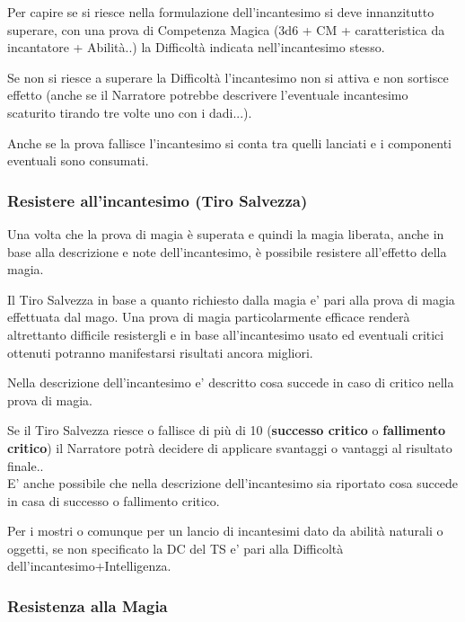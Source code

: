 \begin{multicols}{2}
Per capire se si riesce nella formulazione dell'incantesimo si deve innanzitutto superare, con una prova di Competenza Magica (3d6 + CM + caratteristica da incantatore + Abilità..) la Difficoltà indicata nell'incantesimo stesso.

Se non si riesce a superare la Difficoltà l'incantesimo non si attiva e non sortisce effetto (anche se il Narratore potrebbe descrivere l'eventuale incantesimo scaturito tirando tre volte uno con i dadi...).

Anche se la prova fallisce l'incantesimo si conta tra quelli lanciati e i componenti eventuali sono consumati.

\subsubsection{Resistere all'incantesimo (Tiro Salvezza)}

\label{resistere-allessenza-tiro-salvezza}

Una volta che la prova di magia è superata e quindi la magia liberata, anche in base alla descrizione e note dell'incantesimo, è possibile resistere all'effetto della magia.

Il Tiro Salvezza in base a quanto richiesto dalla magia e' pari alla prova di magia effettuata dal mago. Una prova di magia particolarmente efficace renderà altrettanto difficile resistergli e in base all'incantesimo usato ed eventuali critici ottenuti potranno manifestarsi risultati ancora migliori.

Nella descrizione dell'incantesimo e' descritto cosa succede in caso di critico nella prova di magia.

Se il Tiro Salvezza riesce o fallisce di più di 10 (\textbf{successo critico} o \textbf{fallimento critico}) il Narratore potrà decidere di applicare svantaggi o vantaggi al risultato finale..\\
E' anche possibile che nella descrizione dell'incantesimo sia riportato cosa succede in casa di successo o fallimento critico.

Per i mostri o comunque per un lancio di incantesimi dato da abilità naturali o oggetti, se non specificato la DC del TS e' pari alla Difficoltà dell'incantesimo+Intelligenza.

\subsubsection{Resistenza alla Magia}


\end{multicols}
